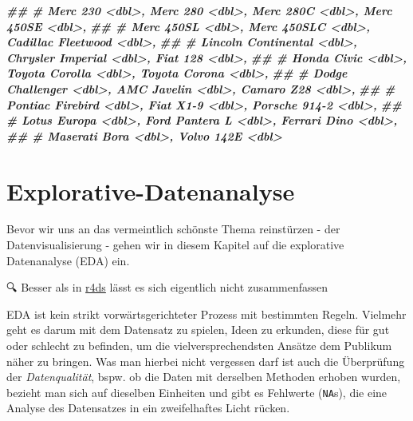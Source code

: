 \documentclass[
]{article}
\newenvironment{Shaded}{\begin{snugshade}}{\end{snugshade}}
\newcommand{\DocumentationTok}[1]{\textcolor[rgb]{0.56,0.35,0.01}{\textbf{\textit{#1}}}}
\begin{document}
\begin{Shaded}
\begin{Highlighting}[]
\DocumentationTok{\#\# \#   Merc 230 \textless{}dbl\textgreater{}, Merc 280 \textless{}dbl\textgreater{}, Merc 280C \textless{}dbl\textgreater{}, Merc 450SE \textless{}dbl\textgreater{},}
\DocumentationTok{\#\# \#   Merc 450SL \textless{}dbl\textgreater{}, Merc 450SLC \textless{}dbl\textgreater{}, Cadillac Fleetwood \textless{}dbl\textgreater{},}
\DocumentationTok{\#\# \#   Lincoln Continental \textless{}dbl\textgreater{}, Chrysler Imperial \textless{}dbl\textgreater{}, Fiat 128 \textless{}dbl\textgreater{},}
\DocumentationTok{\#\# \#   Honda Civic \textless{}dbl\textgreater{}, Toyota Corolla \textless{}dbl\textgreater{}, Toyota Corona \textless{}dbl\textgreater{},}
\DocumentationTok{\#\# \#   Dodge Challenger \textless{}dbl\textgreater{}, AMC Javelin \textless{}dbl\textgreater{}, Camaro Z28 \textless{}dbl\textgreater{},}
\DocumentationTok{\#\# \#   Pontiac Firebird \textless{}dbl\textgreater{}, Fiat X1{-}9 \textless{}dbl\textgreater{}, Porsche 914{-}2 \textless{}dbl\textgreater{},}
\DocumentationTok{\#\# \#   Lotus Europa \textless{}dbl\textgreater{}, Ford Pantera L \textless{}dbl\textgreater{}, Ferrari Dino \textless{}dbl\textgreater{},}
\DocumentationTok{\#\# \#   Maserati Bora \textless{}dbl\textgreater{}, Volvo 142E \textless{}dbl\textgreater{}}
\end{Highlighting}
\end{Shaded}

\hypertarget{explorative-datenanalyse}{%
\section{Explorative-Datenanalyse}\label{explorative-datenanalyse}}

Bevor wir uns an das vermeintlich schönste Thema reinstürzen - der Datenvisualisierung - gehen wir in diesem Kapitel auf die explorative Datenanalyse (EDA) ein.

🔍 Besser als in \href{https://r4ds.had.co.nz/exploratory-data-analysis.html}{r4ds} lässt es sich eigentlich nicht zusammenfassen

EDA ist kein strikt vorwärtsgerichteter Prozess mit bestimmten Regeln. Vielmehr geht es darum mit dem Datensatz zu spielen, Ideen zu erkunden, diese für gut oder schlecht zu befinden, um die vielversprechendsten Ansätze dem Publikum näher zu bringen. Was man hierbei nicht vergessen darf ist auch die Überprüfung der \emph{Datenqualität}, bspw. ob die Daten mit derselben Methoden erhoben wurden, bezieht man sich auf dieselben Einheiten und gibt es Fehlwerte (\texttt{NA}s), die eine Analyse des Datensatzes in ein zweifelhaftes Licht rücken.
\end{document}
